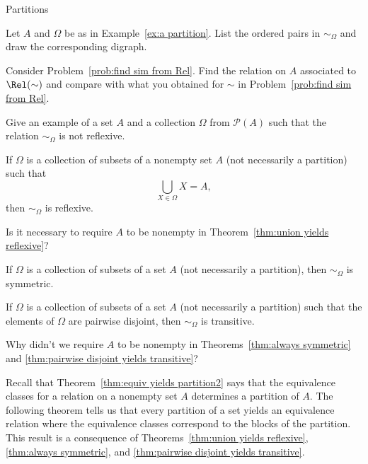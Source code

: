 \begin{section}{Partitions}
\begin{problem}
Let $A$ and $\Omega$ be as in Example~\ref{ex:a partition}. List the ordered pairs in $\sim_{\Omega}$ and draw the corresponding digraph.
\end{problem}

\begin{problem}
Consider Problem~\ref{prob:find sim from Rel}. Find the relation on $A$ associated to $\Rel(\sim)$ and compare with what you obtained for $\sim$ in Problem~\ref{prob:find sim from Rel}.
\end{problem}

\begin{problem}
Give an example of a set $A$ and a collection $\Omega$ from $\mathcal{P}(A)$ such that the relation $\sim_{\Omega}$ is not reflexive.
\end{problem}

\begin{theorem}\label{thm:union yields reflexive}
If $\Omega$ is a collection of subsets of a nonempty set $A$ (not necessarily a partition) such that
\[
\bigcup_{X\in\Omega}X=A,
\]
then $\sim_{\Omega}$ is reflexive.
\end{theorem}

\begin{problem}
Is it necessary to require $A$ to be nonempty in Theorem~\ref{thm:union yields reflexive}?
\end{problem}

\begin{theorem}\label{thm:always symmetric}
If $\Omega$ is a collection of subsets of a set $A$ (not necessarily a partition), then $\sim_{\Omega}$ is symmetric.
\end{theorem}

\begin{theorem}\label{thm:pairwise disjoint yields transitive}
If $\Omega$ is a collection of subsets of a set $A$ (not necessarily a partition) such that the elements of $\Omega$ are pairwise disjoint, then $\sim_{\Omega}$ is transitive.
\end{theorem}

\begin{problem}
Why didn't we require $A$ to be nonempty in Theorems~\ref{thm:always symmetric} and \ref{thm:pairwise disjoint yields transitive}?
\end{problem}

Recall that Theorem~\ref{thm:equiv yields partition2} says that the equivalence classes for a relation on a nonempty set $A$ determines a partition of $A$.  The following theorem tells us that every partition of a set yields an equivalence relation where the equivalence classes correspond to the blocks of the partition. This result is a consequence of Theorems~\ref{thm:union yields reflexive}, \ref{thm:always symmetric}, and \ref{thm:pairwise disjoint yields transitive}.


\end{section}
